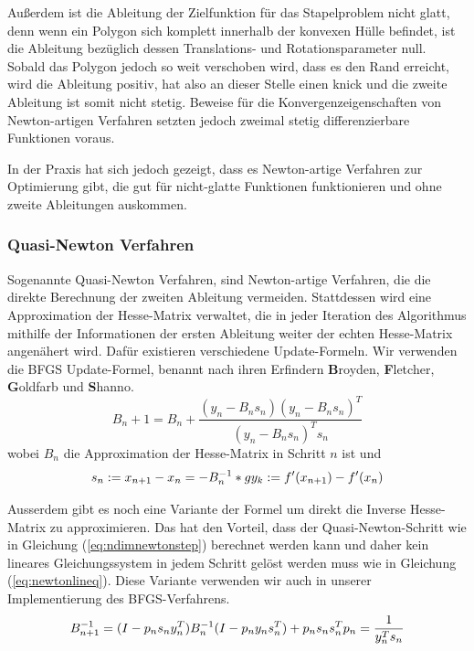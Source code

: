 \documentclass[runningheads,a4paper]{llncs}
\begin{document}
Außerdem ist die Ableitung der Zielfunktion für das Stapelproblem nicht glatt, denn wenn ein Polygon sich komplett innerhalb der konvexen Hülle befindet, ist die Ableitung bezüglich dessen Translations- und Rotationsparameter null. Sobald das Polygon jedoch so weit verschoben wird, dass es den Rand erreicht, wird die Ableitung positiv, hat also an dieser Stelle einen knick und die zweite Ableitung ist somit nicht stetig. Beweise für die Konvergenzeigenschaften von Newton-artigen Verfahren setzten jedoch zweimal stetig differenzierbare Funktionen voraus.

In der Praxis hat sich jedoch gezeigt, dass es Newton-artige Verfahren zur Optimierung gibt, die gut für nicht-glatte Funktionen funktionieren \cite{DBLP:journals/mp/LewisO13} und ohne zweite Ableitungen auskommen.

\subsubsection{Quasi-Newton Verfahren}

Sogenannte Quasi-Newton Verfahren, sind Newton-artige Verfahren, die die direkte Berechnung der zweiten Ableitung vermeiden. Stattdessen wird eine Approximation der Hesse-Matrix verwaltet, die in jeder Iteration des Algorithmus mithilfe der Informationen der ersten Ableitung weiter der echten Hesse-Matrix angenähert wird. Dafür existieren verschiedene Update-Formeln. Wir verwenden die BFGS Update-Formel, benannt nach ihren Erfindern \textbf{B}royden, \textbf{F}letcher, \textbf{G}oldfarb und \textbf{S}hanno. \cite{nocedal1999numerical}
\begin{equation*}
B_n+1 = B_n + \frac{(y_n- B_ns_n) (y_n-B_ns_n)^T}{(y_n- B_n s_n)^T s_n}
\end{equation*}
wobei $B_n$ die Approximation der Hesse-Matrix in Schritt $n$ ist und
\begin{equation*}
s_n := x_{n+1} - x_n = -B_n^{-1}*g\\
y_k := f'(x_{n+1}) - f'(x_n)
\end{equation*}

Ausserdem gibt es noch eine Variante der Formel um direkt die Inverse Hesse-Matrix zu approximieren. Das hat den Vorteil, dass der Quasi-Newton-Schritt wie in Gleichung (\ref{eq:ndimnewtonstep}) berechnet werden kann und daher kein lineares Gleichungssystem in jedem Schritt gelöst werden muss wie in Gleichung (\ref{eq:newtonlineq}). Diese Variante verwenden wir auch in unserer Implementierung des BFGS-Verfahrens.
\begin{equation}
\label{eq:bfgsinverse}
B_{n+1}^{-1} = (I - p_n s_n y_n^T) B_n^{-1} (I - p_n y_n s_n^T) + p_n s_n s_n^T \\ p_n = \frac{1}{y_n^Ts_n}
\end{equation}
\end{document}
